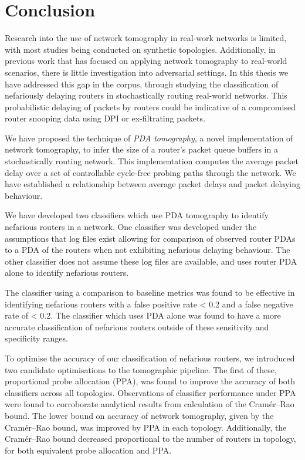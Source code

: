 \chapter{Conclusion}
\label{cha:conc}
Research into the use of network tomography in real-work networks is limited, with most studies being conducted on synthetic topologies. Additionally, in previous work that has focused on applying network tomography to real-world scenarios, there is little investigation into adversarial settings. In this thesis we have addressed this gap in the corpus, through studying the classification of nefariously delaying routers in stochastically routing real-world networks. This probabilistic delaying of packets by routers could be indicative of a compromised router snooping data using DPI or ex-filtrating packets.\par
We have proposed the technique of \textit{PDA tomography}, a novel implementation of network tomography, to infer the size of a router's packet queue buffers in a stochastically routing network. This implementation computes the average packet delay over a set of controllable cycle-free probing paths through the network. We have established a relationship between average packet delays and packet delaying behaviour.\par
We have developed two classifiers which use PDA tomography to identify nefarious routers in a network. One classifier was developed under the assumptions that log files exist allowing for comparison of observed router PDAs to a PDA of the routers when not exhibiting nefarious delaying behaviour. The other classifier does not assume these log files are available, and uses router PDA alone to identify nefarious routers.\par
The classifier using a comparison to baseline metrics was found to be effective in identifying nefarious routers with a false positive rate < 0.2 and a false negative rate of < 0.2. The classifier which uses PDA alone was found to have a more accurate classification of nefarious routers outside of these sensitivity and specificity ranges.\par
To optimise the accuracy of our classification of nefarious routers, we introduced two candidate optimisations to the tomographic pipeline. The first of these, proportional probe allocation (PPA), was found to improve the accuracy of both classifiers across all topologies. Observations of classifier performance under PPA were found to corroborate analytical results from calculation of the Cramér–Rao bound. The lower bound on accuracy of network tomography, given by the Cramér–Rao bound, was improved by PPA in each topology. Additionally, the Cramér–Rao bound decreased proportional to the number of routers in topology, for both equivalent probe allocation and PPA.\par
